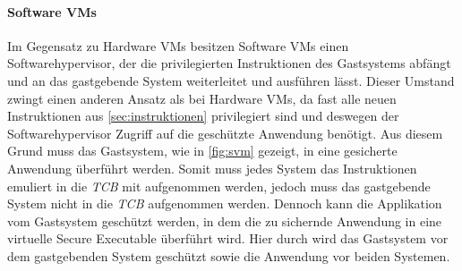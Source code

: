 \documentclass[ngerman]{sig-alternate-05-2015}
\begin{document}
\paragraph{Software VMs}
Im Gegensatz zu Hardware VMs besitzen Software VMs einen Softwarehypervisor, der die privilegierten Instruktionen des Gastsystems abfängt und an das gastgebende System weiterleitet und ausführen lässt. Dieser Umstand zwingt einen anderen Ansatz als bei Hardware VMs, da fast alle neuen Instruktionen aus \cref{sec:instruktionen} privilegiert sind und deswegen der Softwarehypervisor Zugriff auf die geschützte Anwendung benötigt. Aus diesem Grund muss das Gastsystem, wie in \cref{fig:svm} gezeigt, in eine gesicherte Anwendung überführt werden. Somit muss jedes System das Instruktionen emuliert in die \emph{TCB} mit aufgenommen werden, jedoch muss das gastgebende System nicht in die \emph{TCB} aufgenommen werden. Dennoch kann die Applikation vom Gastsystem geschützt werden, in dem die zu sichernde Anwendung in eine virtuelle Secure Executable  überführt wird. Hier durch wird das Gastsystem vor dem gastgebenden System geschützt sowie die Anwendung vor beiden Systemen. 
\end{document}
